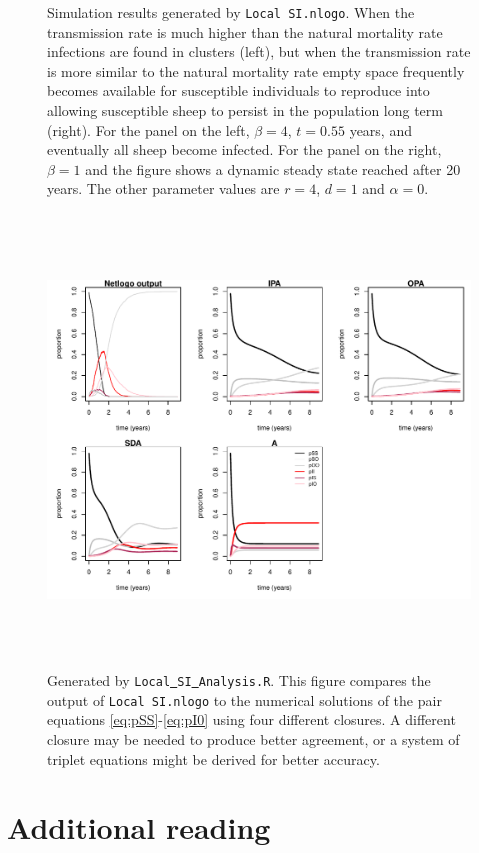 \documentclass[11pt, oneside]{article}   	%
\begin{document}
\begin{figure}
\begin{minipage}{.5\textwidth}
\end{minipage}
\vspace{-2cm}
\caption[]{Simulation results generated by \texttt{Local SI.nlogo}. When the transmission rate is much higher than the natural mortality rate infections are found in clusters (left), but when the transmission rate is more similar to the natural mortality rate empty space frequently becomes available for susceptible individuals to reproduce into allowing susceptible sheep to persist in the population long term (right). For the panel on the left, $\beta = 4$, $t = 0.55$ years, and eventually all sheep become infected. For the panel on the right, $\beta = 1$ and the figure shows a dynamic steady state reached after 20 years. The other parameter values are $r=4$, $d=1$ and $\alpha=0$.}\label{fig:netlogobeta} 
\end{figure}

\begin{figure}
\includegraphics[height=12cm]{closure_comp}
\caption[]{Generated by \texttt{Local\underline{ }SI\underline{ }Analysis.R}. This figure compares the output of  \texttt{Local SI.nlogo} to the numerical solutions of the pair equations \ref{eq:pSS}-\ref{eq:pI0} using four different closures. A different closure may be needed to produce better agreement, or a system of triplet equations might be derived for better accuracy.}\label{fig:closure} 
\end{figure}
\FloatBarrier
\section{Additional reading}\label{sec:AR}
\end{document}
